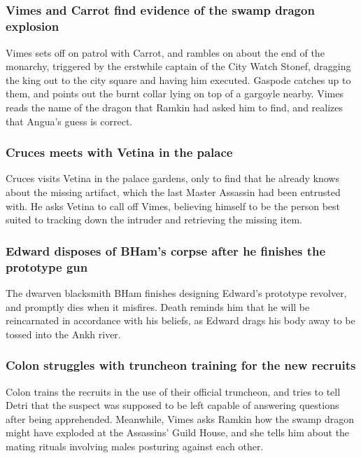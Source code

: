 \subsection{}

\subsubsection{\Gls{Vimes} and \Gls{Carrot} find evidence of the swamp dragon explosion}
\Gls{Vimes} sets off on patrol with \Gls{Carrot}, and rambles on about the end of the monarchy,
triggered by the erstwhile captain of the City Watch \Gls{Stonef}, dragging the king out to the
city square and having him executed. \Gls{Gaspode} catches up to them, and points out the burnt
collar lying on top of a gargoyle nearby. \Gls{Vimes} reads the name of the dragon that \Gls{Ramkin}
had asked him to find, and realizes that \Gls{Angua}'s guess is correct.

\subsubsection{\Gls{Cruces} meets with \Gls{Vetina} in the palace}
\Gls{Cruces} visits \Gls{Vetina} in the palace gardens, only to find that he already knows about the
missing artifact, which the last Master Assassin had been entrusted with. He asks \Gls{Vetina} to
call off \Gls{Vimes}, believing himself to be the person best suited to tracking down the intruder
and retrieving the missing item.

\subsubsection{\Gls{Edward} disposes of \Gls{BHam}'s corpse after he finishes the prototype gun}
The dwarven blacksmith \Gls{BHam} finishes designing \Gls{Edward}'s prototype revolver, and promptly
dies when it misfires. \Gls{Death} reminds him that he will be reincarnated in accordance with his
beliefs, as \Gls{Edward} drags his body away to be tossed into the Ankh river.

\subsubsection{\Gls{Colon} struggles with truncheon training for the new recruits}
\Gls{Colon} trains the recruits in the use of their official truncheon, and tries to tell
\Gls{Detri} that the suspect was supposed to be left capable of answering questions after being
apprehended. Meanwhile, \Gls{Vimes} asks \Gls{Ramkin} how the swamp dragon might have exploded at
the Assassins' Guild House, and she tells him about the mating rituals involving males posturing
against each other.

